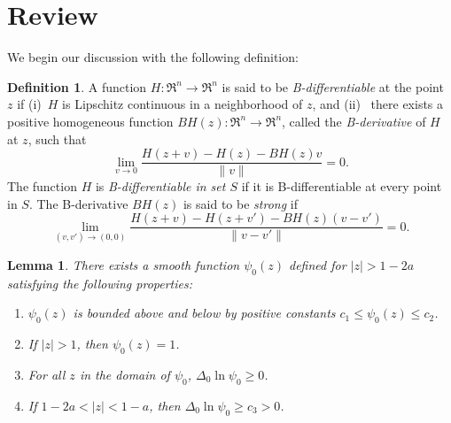 \documentclass[draft]{amsart}
\newtheorem{lem}[thm]{Lemma}
\theoremstyle{definition}
\newtheorem{defn}{Definition}[section]
\theoremstyle{remark}
\begin{document}
\section{Review}
\label{computation}

We begin our discussion with the following definition:

\begin{defn}

A function $H\colon  \Re^n \to \Re^n$ is said to be {\em
B-differentiable} at the point $z$ if (i)~$H$ is Lipschitz
continuous in a neighborhood of $z$, and (ii)~ there exists a positive
homogeneous function $BH(z)\colon  \Re^n \to \Re^n$, called the {\em
B-derivative} of $H$ at $z$, such that
\[ \lim_{v \to 0} \frac{H(z+v) - H(z) - BH(z)v}{\| v \|} = 0. \]
The function $H$ is \textit{B-differentiable in  set $S$} if it is B-differentiable
at every point in $S$.
The B-derivative $BH(z)$ is said to be \textit{strong} if
\[ \lim_{(v,v') \to (0,0)} \frac{H(z+v) - H(z+v') - BH(z)(v
 -v')}{\| v - v' \|}
   = 0. \]
\end{defn}


\begin{lem}\label{limbog} There exists a smooth function $\psi_0(z)$
defined for $|z|>1-2a$ satisfying the following properties\textup{:}
\begin{enumerate}
\renewcommand{\labelenumi}{(\roman{enumi})}
\item $\psi_0(z)$ is bounded above and below by positive constants
$c_1\leq \psi_0(z)\leq c_2$.
\item If $|z|>1$, then $\psi_0(z)=1$.
\item For all $z$ in the domain of $\psi_0$, $\Delta_0\ln \psi_0\geq 0$.
\item If $1-2a<|z|<1-a$, then $\Delta_0\ln \psi_0\geq
c_3>0$.
\end{enumerate}
\end{lem}
\end{document}
